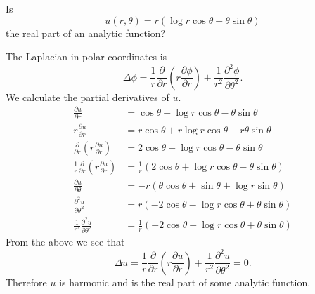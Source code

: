 \begin{Example}
  Is
  \[
  u(r,\theta) = r ( \log r \cos \theta - \theta \sin \theta )
  \]
  the real part of an analytic function?


  The Laplacian in polar coordinates is
  \[
  \Delta \phi = \frac{1}{r} \frac{\partial}{\partial r} \left( r \frac{\partial \phi}{\partial r} \right)
  + \frac{1}{r^2} \frac{\partial^2 \phi}{\partial \theta^2}.
  \]
  We calculate the partial derivatives of $u$.
  \begin{align*}
    \frac{\partial u}{\partial r} &= \cos \theta + \log r \cos \theta - \theta \sin \theta 
    \\
    r \frac{\partial u}{\partial r} &= r \cos \theta + r \log r \cos \theta
    - r \theta \sin \theta 
    \\
    \frac{\partial}{\partial r} \left( r \frac{\partial u}{\partial r} \right)
    &= 2 \cos \theta + \log r \cos \theta - \theta \sin \theta 
    \\
    \frac{1}{r} \frac{\partial}{\partial r} \left( r \frac{\partial u}{\partial r} \right)
    &= \frac{1}{r} \left( 2  \cos \theta +  \log r \cos \theta -  \theta \sin \theta \right) 
    \\
    \frac{\partial u}{\partial \theta} &= -r \left( \theta \cos \theta + \sin \theta + \log r \sin \theta \right) 
    \\
    \frac{\partial^2 u}{\partial \theta^2} &= r \left( - 2 \cos \theta - \log r \cos \theta 
      + \theta \sin \theta \right) 
    \\
    \frac{1}{r^2} \frac{\partial^2 u}{\partial \theta^2} &= \frac{1}{r} 
    \left( - 2 \cos \theta - \log r \cos \theta + \theta \sin \theta \right)
  \end{align*}
  From the above we see that
  \[
  \Delta u = \frac{1}{r} \frac{\partial}{\partial r} \left( r \frac{\partial u}{\partial r} \right)
  + \frac{1}{r^2} \frac{\partial^2 u}{\partial \theta^2} = 0.
  \]
  Therefore $u$ is harmonic and is the real part of some analytic function.
\end{Example}








